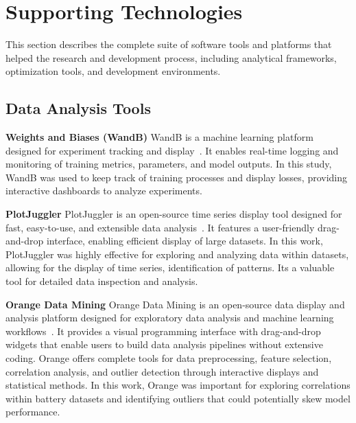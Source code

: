 
\section{Supporting Technologies}

This section describes the complete suite of software tools and platforms that helped the research and development process, including analytical frameworks, optimization tools, and development environments.

\subsection{Data Analysis Tools}


\textbf{Weights and Biases (WandB)}
\label{subsec:wandb}
WandB is a machine learning platform designed for experiment tracking and display~\cite{noauthor_weights_nodate}. It enables real-time logging and monitoring of training metrics, parameters, and model outputs. In this study, WandB was used to keep track of training processes and display losses, providing interactive dashboards to analyze experiments.

\textbf{PlotJuggler}
PlotJuggler is an open-source time series display tool designed for fast, easy-to-use, and extensible data analysis~\cite{faconti_facontidavideplotjuggler_2025}. It features a user-friendly drag-and-drop interface, enabling efficient display of large datasets. In this work, PlotJuggler was highly effective for exploring and analyzing data within datasets, allowing for the display of time series, identification of patterns. Its a valuable tool for detailed data inspection and analysis.

\textbf{Orange Data Mining}
Orange Data Mining is an open-source data display and analysis platform designed for exploratory data analysis and machine learning workflows~\cite{noauthor_biolaborange3_nodate}. It provides a visual programming interface with drag-and-drop widgets that enable users to build data analysis pipelines without extensive coding. Orange offers complete tools for data preprocessing, feature selection, correlation analysis, and outlier detection through interactive displays and statistical methods. In this work, Orange was important for exploring correlations within battery datasets and identifying outliers that could potentially skew model performance.

